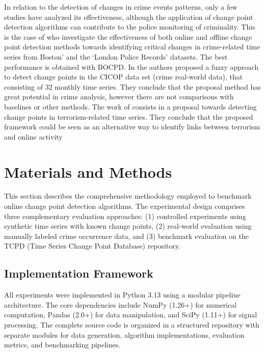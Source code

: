 \documentclass[journal,article,submit,pdftex,moreauthors]{Definitions/mdpi}
\begin{document}
In relation to the detection of changes in crime events patterns, only a few studies have analyzed its effectiveness, although the application of change point detection algorithms can contribute to the police monitoring of criminality. This is the case of \cite{konstantinou2023trend} who investigate the effectiveness of both online and offline change point detection methods towards identifying critical changes in crime-related time series from Boston’ and the ‘London Police Records’ datasets. The best performance is obtained with BOCPD. In \cite{albertetti2016change} the authors proposed a fuzzy approach to detect change points in the CICOP data set (crime real-world data), that consisting of 32 monthly time series. They conclude that the proposal method has great potential in crime analysis, however there are not comparisons with baselines or other methods.  The work of \cite{theodosiadou2021change} consists in a proposal towards detecting change points in terrorism-related time series. They conclude that the proposed framework could be seen as an alternative way to identify links between terrorism and online activity


\section{Materials and Methods}

This section describes the comprehensive methodology employed to benchmark online change point detection algorithms. The experimental design comprises three complementary evaluation approaches: (1) controlled experiments using synthetic time series with known change points, (2) real-world evaluation using manually labeled crime occurrence data, and (3) benchmark evaluation on the TCPD (Time Series Change Point Database) repository.

\subsection{Implementation Framework}

All experiments were implemented in Python 3.13 using a modular pipeline architecture. The core dependencies include NumPy (1.26+) for numerical computation, Pandas (2.0+) for data manipulation, and SciPy (1.11+) for signal processing. The complete source code is organized in a structured repository with separate modules for data generation, algorithm implementations, evaluation metrics, and benchmarking pipelines.
\end{document}
